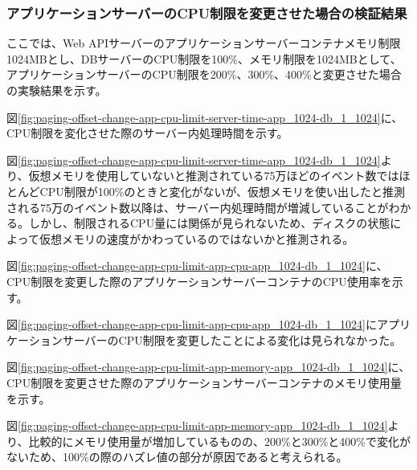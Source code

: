 \documentclass[../../../../main]{subfiles}
\begin{document}
    \subsubsection{アプリケーションサーバーのCPU制限を変更させた場合の検証結果}\label{subsubsec:result-paging-offset-change-app-cpu}

    ここでは、Web APIサーバーのアプリケーションサーバーコンテナメモリ制限1024MBとし、DBサーバーのCPU制限を100\%、メモリ制限を1024MBとして、アプリケーションサーバーのCPU制限を200\%、300\%、400\%と変更させた場合の実験結果を示す。


    図\ref{fig:paging-offset-change-app-cpu-limit-server-time-app_1024-db_1_1024}に、CPU制限を変化させた際のサーバー内処理時間を示す。

    

    図\ref{fig:paging-offset-change-app-cpu-limit-server-time-app_1024-db_1_1024}より、仮想メモリを使用していないと推測されている75万ほどのイベント数ではほとんどCPU制限が100\%のときと変化がないが、仮想メモリを使い出したと推測される75万のイベント数以降は、サーバー内処理時間が増減していることがわかる。しかし、制限されるCPU量には関係が見られないため、ディスクの状態によって仮想メモリの速度がかわっているのではないかと推測される。


    図\ref{fig:paging-offset-change-app-cpu-limit-app-cpu-app_1024-db_1_1024}に、CPU制限を変更した際のアプリケーションサーバーコンテナのCPU使用率を示す。

    

    図\ref{fig:paging-offset-change-app-cpu-limit-app-cpu-app_1024-db_1_1024}にアプリケーションサーバーのCPU制限を変更したことによる変化は見られなかった。


    図\ref{fig:paging-offset-change-app-cpu-limit-app-memory-app_1024-db_1_1024}に、CPU制限を変更させた際のアプリケーションサーバーコンテナのメモリ使用量を示す。

    


    図\ref{fig:paging-offset-change-app-cpu-limit-app-memory-app_1024-db_1_1024}より、比較的にメモリ使用量が増加しているものの、200\%と300\%と400\%で変化がないため、100\%の際のハズレ値の部分が原因であると考えられる。
\end{document}
